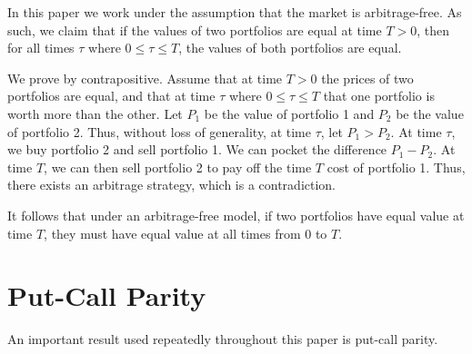 \documentclass[reqno]{amsart}
\begin{document}
In this paper we work under the assumption that the market is arbitrage-free. As such, we claim that if the values of two portfolios are equal at time $T > 0$, then for all times $\tau$ where $0 \leq \tau \leq T$, the values of both portfolios are equal.

We prove by contrapositive. Assume that at time $T > 0$ the prices of two portfolios are equal, and that at time $\tau$ where $0 \leq \tau \leq T$ that one portfolio is worth more than the other. 
Let $P_1$ be the value of portfolio 1 and $P_2$ be the value of portfolio 2. Thus, without loss of generality, at time $\tau$, let $P_1 > P_2$.
At time $\tau$, we buy portfolio 2 and sell portfolio 1. We can pocket the difference $P_1 - P_2$. At time $T$, we can then sell portfolio 2 to pay off the time $T$ cost of portfolio 1. 
Thus, there exists an arbitrage strategy, which is a contradiction.

It follows that under an arbitrage-free model, if two portfolios have equal value at time $T$, they must have equal value at all times from $0$ to $T$.

\section{Put-Call Parity}\label{PC parity appendix}

An important result used repeatedly throughout this paper is put-call parity. 
\end{document}
